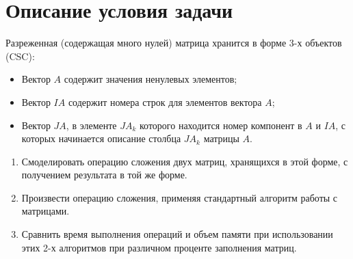 \section{Описание условия задачи}
Разреженная (содержащая много нулей) матрица хранится в форме 3-х объектов
(CSC):
\begin{itemize}
	\item Вектор $A$ содержит значения ненулевых элементов;
	\item Вектор $IA$ содержит номера строк для элементов вектора $A$;
	\item Вектор $JA$, в элементе $JA_k$ которого находится номер компонент в $A$ и $IA$, с которых начинается описание столбца $JA_k$  матрицы $A$.
\end{itemize}

\begin{enumerate}
	\item Смоделировать операцию сложения двух матриц, хранящихся в этой форме, с получением результата в той же форме.
	\item Произвести операцию сложения, применяя стандартный алгоритм
	работы с матрицами.
	\item Сравнить время выполнения операций и объем памяти при использовании этих 2-х алгоритмов при различном проценте заполнения
	матриц.
\end{enumerate}